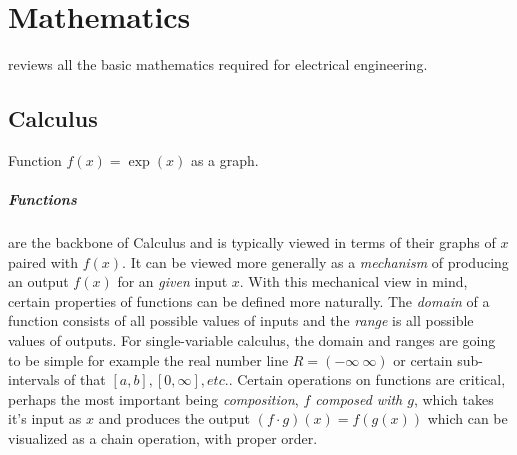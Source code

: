 \cleardoublepage
\chapter{Mathematics}
\label{ch:math}

 reviews all the basic mathematics required for electrical engineering. 

\section{Calculus}
\begin{marginfigure}[-10\baselineskip]
  \caption{Function $f(x)=\exp(x)$ as a graph.}
\end{marginfigure}
\paragraph{Functions} are the backbone of Calculus and is typically viewed in terms of their graphs of $x$ paired with $f(x)$. It can be viewed more generally as a {\it mechanism} of producing an output $f(x)$ for an {\it given} input $x$. With this mechanical view in mind, certain properties of functions can be defined more naturally. The {\it domain} of a function consists of all possible values of inputs and the {\it range} is all possible values of outputs. For single-variable calculus, the domain and ranges are going to be simple for example the real number line $R=(-\infty ~\infty)$ or certain sub-intervals of that $[a,b], [0, \infty], etc.$. 
Certain operations on functions are critical, perhaps the most important being \textit{composition}, \textit{$f$ composed with $g$}, which takes it's input as $x$ and produces the output $(f\cdot g)(x)=f(g(x))$ which can be visualized as a chain operation, with proper order.
